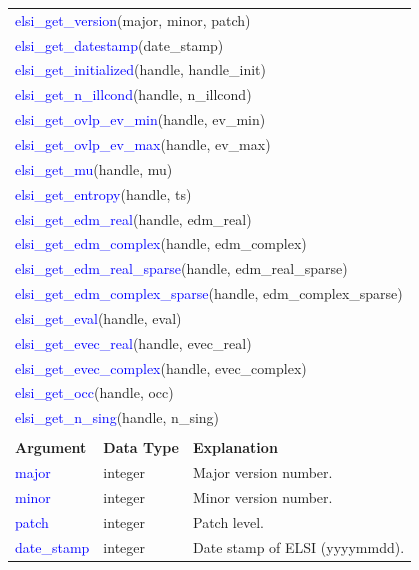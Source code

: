 \documentclass{report}
\newcommand{\tcb}[1]{\textcolor{blue}{#1}}
\begin{document}
\begin{longtable}[]{|p{30mm}|p{45mm}|p{90mm}|}
\multicolumn{3}{l}{\tcb{elsi\_get\_version}(major, minor, patch)}\\
\multicolumn{3}{l}{\tcb{elsi\_get\_datestamp}(date\_stamp)}\\
\multicolumn{3}{l}{\tcb{elsi\_get\_initialized}(handle, handle\_init)}\\
\multicolumn{3}{l}{\tcb{elsi\_get\_n\_illcond}(handle, n\_illcond)}\\
\multicolumn{3}{l}{\tcb{elsi\_get\_ovlp\_ev\_min}(handle, ev\_min)}\\
\multicolumn{3}{l}{\tcb{elsi\_get\_ovlp\_ev\_max}(handle, ev\_max)}\\
\multicolumn{3}{l}{\tcb{elsi\_get\_mu}(handle, mu)}\\
\multicolumn{3}{l}{\tcb{elsi\_get\_entropy}(handle, ts)}\\
\multicolumn{3}{l}{\tcb{elsi\_get\_edm\_real}(handle, edm\_real)}\\
\multicolumn{3}{l}{\tcb{elsi\_get\_edm\_complex}(handle, edm\_complex)}\\
\multicolumn{3}{l}{\tcb{elsi\_get\_edm\_real\_sparse}(handle, edm\_real\_sparse)}\\
\multicolumn{3}{l}{\tcb{elsi\_get\_edm\_complex\_sparse}(handle, edm\_complex\_sparse)}\\
\multicolumn{3}{l}{\tcb{elsi\_get\_eval}(handle, eval)}\\
\multicolumn{3}{l}{\tcb{elsi\_get\_evec\_real}(handle, evec\_real)}\\
\multicolumn{3}{l}{\tcb{elsi\_get\_evec\_complex}(handle, evec\_complex)}\\
\multicolumn{3}{l}{\tcb{elsi\_get\_occ}(handle, occ)}\\
\multicolumn{3}{l}{\tcb{elsi\_get\_n\_sing}(handle, n\_sing)}\\
\multicolumn{3}{l}{}\\
\hline
\multicolumn{1}{|l|}{\textbf{Argument}} & \multicolumn{1}{l|}{\textbf{Data Type}} & \multicolumn{1}{l|}{\textbf{Explanation}}\\
\hline
\tcb{major}                & integer                      & Major version number.\\
\hline
\tcb{minor}                & integer                      & Minor version number.\\
\hline
\tcb{patch}                & integer                      & Patch level.\\
\hline
\tcb{date\_stamp}          & integer                      & Date stamp of ELSI (yyyymmdd).\\

\end{longtable}
\end{document}
